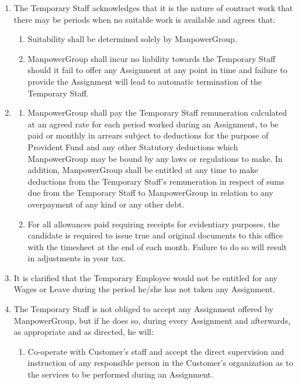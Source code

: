 \documentclass[10pt,a4paper]{article}
\begin{document}
\begin{enumerate}[leftmargin=*, label=\textbf{\arabic*.}, itemsep=4pt]
\item The Temporary Staff acknowledges that it is the nature of contract work that there may be periods
when no suitable work is available and agrees that:
\begin{enumerate}[label=\textbf{(\alph*)}, itemsep=3pt, topsep=2pt]
  \item Suitability shall be determined solely by ManpowerGroup.
  \item ManpowerGroup shall incur no liability towards the Temporary Staff should it fail to offer any
        Assignment at any point in time and failure to provide the Assignment will lead to automatic
        termination of the Temporary Staff.
\end{enumerate}

\item \begin{enumerate}[label=\textbf{(\alph*)}, itemsep=3pt, topsep=2pt]
  \item  ManpowerGroup shall pay the Temporary Staff remuneration calculated at an agreed rate for
each period worked during an Assignment, to be paid or monthly in arrears subject to
deductions for the purpose of Provident Fund and any other Statutory deductions which
ManpowerGroup may be bound by any laws or regulations to make. In addition,
ManpowerGroup shall be entitled at any time to make deductions from the Temporary Staff's
remuneration in respect of sums due from the Temporary Staff to ManpowerGroup in relation to
any overpayment of any kind or any other debt.

  \item  For all allowances paid requiring receipts for evidentiary purposes, the candidate is required to
issue true and original documents to this office with the timesheet at the end of each month.
Failure to do so will result in adjustments in your tax.

\end{enumerate}
\item It is clarified that the Temporary Employee would not be entitled for any Wages or Leave during
the period he/she has not taken any Assignment.

\item The Temporary Staff is not obliged to accept any Assignment offered by ManpowerGroup, but if he
does so, during every Assignment and afterwards, as appropriate and as directed, he will:
\begin{enumerate}[label=\textbf{(\alph*)}, itemsep=3pt, topsep=2pt]
  \item Co-operate with Customer's staff and accept the direct supervision and instruction of any
        responsible person in the Customer's organization as to the services to be performed during
        an Assignment.
\end{enumerate}

\end{enumerate}
\end{document}
